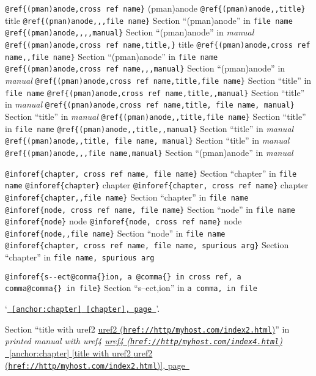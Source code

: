 \documentclass{book}
\renewcommand{\_}{\Texinfounderscore\discretionary{}{}{}}
\begin{document}
\texttt{@ref\{(pman)anode,cross ref name\}} (pman)anode
\texttt{@ref\{(pman)anode{,}{,}title\}} title
\texttt{@ref\{(pman)anode{,}{,},file name\}} Section ``(pman)anode'' in \texttt{file name}
\texttt{@ref\{(pman)anode{,}{,}{,}{,}manual\}} Section ``(pman)anode'' in \textsl{manual}
\texttt{@ref\{(pman)anode,cross ref name,title,\}} title
\texttt{@ref\{(pman)anode,cross ref name{,}{,}file name\}} Section ``(pman)anode'' in \texttt{file name}
\texttt{@ref\{(pman)anode,cross ref name{,}{,},manual\}} Section ``(pman)anode'' in \textsl{manual}
\texttt{@ref\{(pman)anode,cross ref name,title,file name\}} Section ``title'' in \texttt{file name}
\texttt{@ref\{(pman)anode,cross ref name,title{,}{,}manual\}} Section ``title'' in \textsl{manual}
\texttt{@ref\{(pman)anode,cross ref name,title,\ file name,\ manual\}} Section ``title'' in \textsl{manual}
\texttt{@ref\{(pman)anode{,}{,}title,file name\}} Section ``title'' in \texttt{file name}
\texttt{@ref\{(pman)anode{,}{,}title{,}{,}manual\}} Section ``title'' in \textsl{manual}
\texttt{@ref\{(pman)anode{,}{,}title,\ file name,\ manual\}} Section ``title'' in \textsl{manual}
\texttt{@ref\{(pman)anode{,}{,},file name,manual\}} Section ``(pman)anode'' in \textsl{manual}


\texttt{@inforef\{chapter,\ cross ref name,\ file name\}} Section ``chapter'' in \texttt{file name}
\texttt{@inforef\{chapter\}} chapter
\texttt{@inforef\{chapter,\ cross ref name\}} chapter
\texttt{@inforef\{chapter{,}{,}file name\}} Section ``chapter'' in \texttt{file name}
\texttt{@inforef\{node,\ cross ref name,\ file name\}} Section ``node'' in \texttt{file name}
\texttt{@inforef\{node\}} node
\texttt{@inforef\{node,\ cross ref name\}} node
\texttt{@inforef\{node{,}{,}file name\}} Section ``node'' in \texttt{file name}
\texttt{@inforef\{chapter,\ cross ref name,\ file name,\ spurious arg\}} Section ``chapter'' in \texttt{file name,\ spurious arg}

\texttt{@inforef\{s{-}{-}ect@comma\{\}ion,\ a @comma\{\}\ in cross
ref,\ a comma@comma\{\}\ in file\}}
Section ``s--ect,ion'' in \texttt{a comma,\ in file}

`\texttt{\hyperref[anchor:chapter]{\chaptername~\ref*{anchor:chapter} [chapter], page~\pageref*{anchor:chapter}}}'.

Section ``title with uref2 \href{href://http/myhost.com/index2.html}{uref2 (\nolinkurl{href://http/myhost.com/index2.html})}'' in \textsl{printed manual with uref4 \href{href://http/myhost.com/index4.html}{uref4 (\nolinkurl{href://http/myhost.com/index4.html})}}
\hyperref[anchor:chapter]{\chaptername~\ref*{anchor:chapter} [title with uref2 \href{href://http/myhost.com/index2.html}{uref2 (\nolinkurl{href://http/myhost.com/index2.html})}], page~\pageref*{anchor:chapter}}
\end{document}
